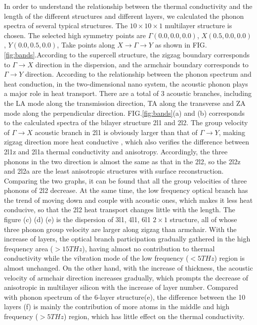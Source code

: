 \documentclass[%
 reprint,
 amsmath,amssymb,
 aps,
 prb,
]{revtex4-1}
\begin{document}
In order to understand the relationship between the thermal conductivity and the length of the different structures and different layers, we calculated the phonon spectra of several typical structures. The $10 \times  10  \times  1$ multilayer structure is chosen. The selected high symmetry points are $\Gamma(0.0, 0.0, 0.0)$, $X(0.5, 0.0, 0.0)$,  $Y(0.0, 0.5, 0.0)$, Take points along $ X \rightarrow \Gamma \rightarrow Y$ as shown in FIG.\ref{fig:bands}.According to the supercell structure, the zigzag boundary corresponds to $ \Gamma \rightarrow X$ direction in the dispersion, and the armchair boundary corresponds to $\Gamma\rightarrow Y$ direction. According to the relationship between the phonon spectrum and heat conduction, in the two-dimensional nano system, the acoustic phonon plays a major role in heat transport. There are a total of 3 acoustic branches, including the LA mode along the transmission direction, TA along the transverse and ZA mode along the perpendicular direction. FIG.\ref{fig:bands}(a) and (b) corresponds to the calculated spectra of the bilayer structure 2l1 and 2l2. The group velocity of $\Gamma\rightarrow X$ acoustic branch in 2l1 is obviously larger than that of $\Gamma\rightarrow Y$, making zigzag direction more heat conductive , which also verifies the difference between 2l1z and 2l1a thermal conductivity and anisotropy. Accordingly, the three phonons in the two direction is almost the same as that in the 2l2, so the 2l2z and 2l2a are the least anisotropic structures with surface reconstruction. Comparing the two graphs, it can be found that all the group velocities of three phonons of 2l2 decrease. At the same time, the low frequency optical branch has the trend of moving down and couple with acoustic ones, which makes it less heat conducive, so that the 2l2 heat transport changes little with the length. The figure (c) (d) (e) is the dispersion of 3l1, 4l1, 6l1 $2 \times 1$ structure, all of whose three phonon group velocity are larger along zigzag than armchair. With the increase of layers, the optical branch participation gradually gathered in the high frequency area ($>15THz$), having almost no contribution to thermal conductivity while the vibration mode of the low frequency ($<5THz$) region is almost unchanged. On the other hand, with the increase of thickness, the acoustic velocity of armchair direction increases gradually, which prompts the decrease of anisotropic in multilayer silicon with the increase of layer number. Compared with phonon spectrum of the 6-layer structure(e), the difference between the 10 layers (f) is mainly the contribution of more atoms in the middle and high frequency ($>5THz$) region, which has little effect on the thermal conductivity.
\end{document}
